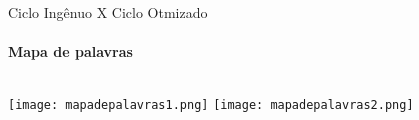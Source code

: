 \begin{frame}[t]{Ciclo Ingênuo X Ciclo Otmizado}
    \transboxout[duration=0.5]
    \framesubtitle{Mapa de palavras}
    
    \begin{columns}
        \newline  
            \texttt{[image: mapadepalavras1.png]}
        \newline  
         \texttt{[image: mapadepalavras2.png]}
    \end{columns}
    
\end{frame}
